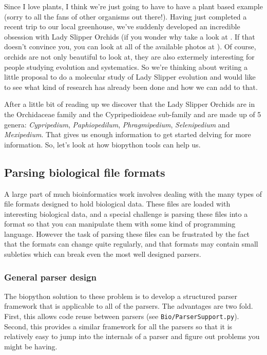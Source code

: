 \documentclass{article}
\begin{document}
Since I love plants, I think we're just going to have to have a plant based example (sorry to all the fans of other organisms out there!).  Having just completed a recent trip to our local greenhouse, we've suddenly developed an incredible obsession with Lady Slipper Orchids (if you wonder why take a look at . If that doesn't convince you, you can look at all of the available photos at  ).  Of course, orchids are not only beautiful to look at, they are also extermely interesting for people studying evolution and systematics. So we're thinking about writing a little proposal to do a molecular study of Lady Slipper evolution and would like to see what kind of research has already been done and how we can add to that.


After a little bit of reading up we discover that the Lady Slipper Orchids are in the Orchidaceae family and the Cypripedioideae sub-family and are made up of 5 genera:  \emph{Cypripedium}, \emph{Paphiopedilum}, \emph{Phragmipedium}, \emph{Selenipedium} and \emph{Mexipedium}. That gives us enough information to get started delving for more information. So, let's look at how biopython tools can help us.

\subsection{Parsing biological file formats}

A large part of much bioinformatics work involves dealing with the many types of file formats designed to hold biological data. These files are loaded with interesting biological data, and a special challenge is parsing these files into a format so that you can manipulate them with some kind of programming language. However the task of parsing these files can be frustrated by the fact that the formats can change quite regularly, and that formats may contain small subleties which can break even the most well designed parsers. 

\subsubsection{General parser design}

The biopython solution to these problem is to develop a structured parser framework that is applicable to all of the parsers. The advantages are two fold. First, this allows code reuse between parsers (see \verb|Bio/ParserSupport.py|). Second, this provides a similar framework for all the parsers so that it is relatively easy to jump into the internals of a parser and figure out problems you might be having. 
\end{document}
